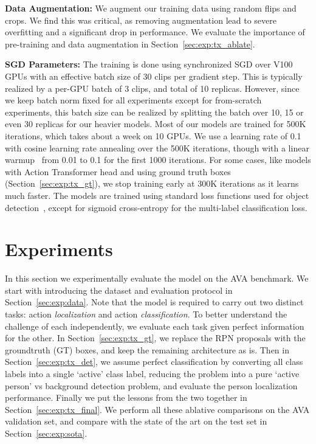 \documentclass[10pt,twocolumn,letterpaper]{article}
\newcommand{\Tx}[0]{Action Transformer}
\begin{document}
{\noindent \bf Data Augmentation:} We augment our training data using random flips and crops. We find this was critical, as removing augmentation lead to severe overfitting and a significant drop in performance.
We evaluate the importance of pre-training and data augmentation in Section~\ref{sec:exp:tx_ablate}.


{\noindent \bf SGD Parameters:} The training is done using
synchronized SGD over V100 GPUs with an effective batch size of 30
clips per gradient step. This is typically realized by a per-GPU batch
of 3 clips, and total of 10 replicas. However, since we keep batch
norm fixed for all experiments except for from-scratch experiments,
this batch size can be realized by
splitting the batch over 10, 15 or even 30 replicas for our heavier
models. 
Most of our models are trained for 500K iterations, which
takes about a week on 10 GPUs. We use a learning rate of 0.1 with
cosine learning rate annealing over the 500K iterations, though with a
linear warmup~\cite{goyal2017accurate} from 0.01 to 0.1 for the first
1000 iterations.  For some cases, like models with \Tx{} head and
using ground truth boxes
(Section~\ref{sec:exp:tx_gt}), we stop training early at 300K
iterations as it learns much faster.  The models are trained using
standard loss functions used for object
detection~\cite{huang2017speed}, except for sigmoid cross-entropy for the multi-label classification loss.

 \section{Experiments}\label{sec:exp}

In this section we experimentally evaluate the model on the AVA
benchmark. We start with introducing the dataset and evaluation
protocol in Section~\ref{sec:exp:data}.  Note that the model is
required to carry out two distinct tasks: action {\em localization}
and action {\em classification}. To better understand the challenge of  each independently,
we evaluate each task given perfect
information for the other. In Section~\ref{sec:exp:tx_gt}, we
replace  the RPN proposals with the groundtruth (GT) boxes,   and keep
the remaining architecture as is.  Then in
Section~\ref{sec:exp:tx_det}, we assume perfect classification  by
converting all class labels into a single `active' class label,
reducing the problem into a pure `active person' vs background
detection problem, and evaluate the person
localization performance. Finally we put the lessons from the two together
in Section~\ref{sec:exp:tx_final}. 
We perform all these ablative comparisons on the AVA validation set,
and compare with the state of the art on the test set in Section~\ref{sec:exp:sota}.
\end{document}
